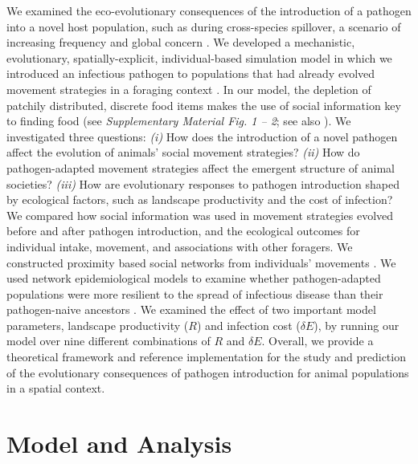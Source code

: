 We examined the eco-evolutionary consequences of the introduction of a pathogen into a novel host population, such as during cross-species spillover, a scenario of increasing frequency and global concern \citep{blehert2009,globconsorth5n82016,fereidouni2019,scheele2019,sanderson2020,carlson2021,kuchipudi2022}.
We developed a mechanistic, evolutionary, spatially-explicit, individual-based simulation model in which we introduced an infectious pathogen to populations that had already evolved movement strategies in a foraging context \citep[see model code, analysis code, and reference data:][]{gupte2022,gupte2022a,gupte2022b}.
In our model, the depletion of patchily distributed, discrete food items makes the use of social information key to finding food (see \textit{Supplementary Material Fig. 1 -- 2}; see also \citealt{gupte2021a}).
We investigated three questions: \textit{(i)} How does the introduction of a novel pathogen affect the evolution of animals' social movement strategies?
\textit{(ii)} How do pathogen-adapted movement strategies affect the emergent structure of animal societies?
\textit{(iii)} How are evolutionary responses to pathogen introduction shaped by ecological factors, such as landscape productivity and the cost of infection?
We compared how social information was used in movement strategies evolved before and after pathogen introduction, and the ecological outcomes for individual intake, movement, and associations with other foragers.
We constructed proximity based social networks from individuals' movements \citep{whitehead2008,white2017,wilber2022}.
We used network epidemiological models to examine whether pathogen-adapted populations were more resilient to the spread of infectious disease than their pathogen-naive ancestors \citep[][]{white2017,stroeymeyt2018,wilber2022}.
We examined the effect of two important model parameters, landscape productivity ($R$) and infection cost ($\delta E$), by running our model over nine different combinations of $R$ and $\delta E$.
Overall, we provide a theoretical framework and reference implementation for the study and prediction of the evolutionary consequences of pathogen introduction for animal populations in a spatial context.

\section*{Model and Analysis}

